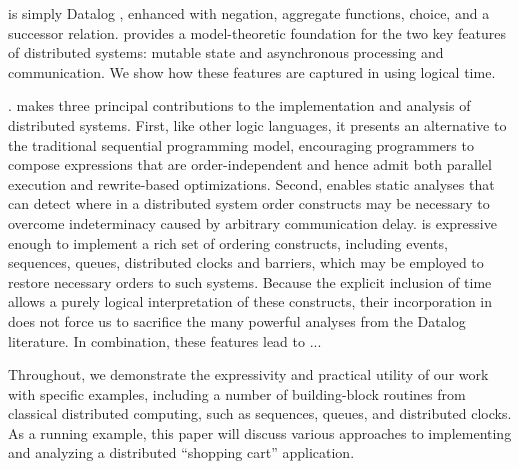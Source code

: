 \lang is simply
Datalog , enhanced with negation, aggregate functions, choice,
and a successor relation.  
\lang provides a model-theoretic 
foundation
for the two key features of distributed systems: mutable state and
asynchronous processing and communication.  We show how these features
are captured in \lang using logical time. 

.
\lang makes three principal contributions to the implementation and analysis
of distributed systems.  First, like other logic languages, it presents an
alternative to the traditional sequential programming model,  encouraging
programmers to compose expressions that are order-independent and hence admit
both parallel execution and rewrite-based optimizations.
Second, \lang enables static analyses that can detect where in a distributed system
order constructs may be necessary to overcome indeterminacy caused by arbitrary
communication delay.  \lang is expressive enough to implement a rich set of ordering
constructs, including events, sequences, queues,
distributed clocks and barriers,
which may be employed to restore necessary orders to such systems.
Because the explicit inclusion of time allows a purely logical interpretation of 
these constructs, their incorporation in \lang does not force us to sacrifice 
the many powerful analyses from the Datalog literature.
In combination, these features lead to ... 

Throughout, we demonstrate the expressivity
and practical utility of our work with specific examples, including a
number of building-block routines from classical distributed
computing, such as sequences, queues, and distributed clocks.  
As a running example, this paper will discuss various approaches to 
implementing and analyzing a distributed ``shopping cart'' application.

